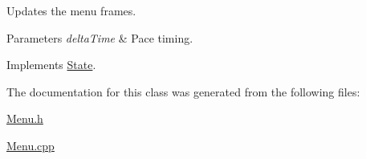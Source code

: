 Updates the menu frames. 


\begin{DoxyParams}{Parameters}
{\em delta\+Time} & Pace timing. \\
\hline
\end{DoxyParams}


Implements \mbox{\hyperlink{classState_a770f40188fdfc64bc95a5166fef12e02}{State}}.



The documentation for this class was generated from the following files\+:\begin{DoxyCompactItemize}
\item 
\mbox{\hyperlink{Menu_8h}{Menu.\+h}}\item 
\mbox{\hyperlink{Menu_8cpp}{Menu.\+cpp}}\end{DoxyCompactItemize}
